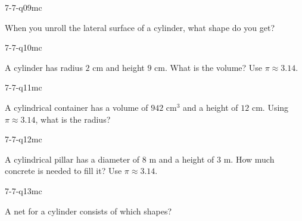 \begin{practiceQuestion}{7-7-q09}{mc}
\begin{questionText}
When you unroll the lateral surface of a cylinder, what shape do you get?
\end{questionText}
\end{practiceQuestion}

\begin{practiceQuestion}{7-7-q10}{mc}
\begin{questionText}
A cylinder has radius $2$ cm and height $9$ cm. What is the volume? Use $\pi \approx 3.14$.
\end{questionText}
\end{practiceQuestion}

\begin{practiceQuestion}{7-7-q11}{mc}
\begin{questionText}
A cylindrical container has a volume of $942$ cm$^3$ and a height of $12$ cm. Using $\pi \approx 3.14$, what is the radius?
\end{questionText}
\end{practiceQuestion}

\begin{practiceQuestion}{7-7-q12}{mc}
\begin{questionText}
A cylindrical pillar has a diameter of $8$ m and a height of $3$ m. How much concrete is needed to fill it? Use $\pi \approx 3.14$.
\end{questionText}
\end{practiceQuestion}

\begin{practiceQuestion}{7-7-q13}{mc}
\begin{questionText}
A net for a cylinder consists of which shapes?
\end{questionText}
\end{practiceQuestion}

